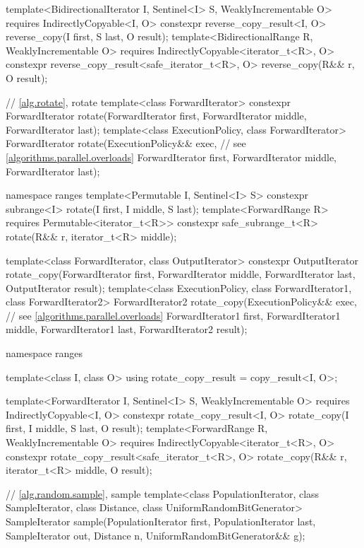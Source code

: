 \begin{codeblock}
{{    template<BidirectionalIterator I, Sentinel<I> S, WeaklyIncrementable O>
      requires IndirectlyCopyable<I, O>
      constexpr reverse_copy_result<I, O>
        reverse_copy(I first, S last, O result);
    template<BidirectionalRange R, WeaklyIncrementable O>
      requires IndirectlyCopyable<iterator_t<R>, O>
      constexpr reverse_copy_result<safe_iterator_t<R>, O>
        reverse_copy(R&& r, O result);
  }

  // \ref{alg.rotate}, rotate
  template<class ForwardIterator>
    constexpr ForwardIterator rotate(ForwardIterator first,
                                     ForwardIterator middle,
                                     ForwardIterator last);
  template<class ExecutionPolicy, class ForwardIterator>
    ForwardIterator rotate(ExecutionPolicy&& exec, // see \ref{algorithms.parallel.overloads}
                           ForwardIterator first,
                           ForwardIterator middle,
                           ForwardIterator last);

  namespace ranges {
    template<Permutable I, Sentinel<I> S>
      constexpr subrange<I> rotate(I first, I middle, S last);
    template<ForwardRange R>
      requires Permutable<iterator_t<R>>
      constexpr safe_subrange_t<R> rotate(R&& r, iterator_t<R> middle);
  }

  template<class ForwardIterator, class OutputIterator>
    constexpr OutputIterator
      rotate_copy(ForwardIterator first, ForwardIterator middle,
                  ForwardIterator last, OutputIterator result);
  template<class ExecutionPolicy, class ForwardIterator1, class ForwardIterator2>
    ForwardIterator2
      rotate_copy(ExecutionPolicy&& exec, // see \ref{algorithms.parallel.overloads}
                  ForwardIterator1 first, ForwardIterator1 middle,
                  ForwardIterator1 last, ForwardIterator2 result);

  namespace ranges {
    template<class I, class O>
    using rotate_copy_result = copy_result<I, O>;

    template<ForwardIterator I, Sentinel<I> S, WeaklyIncrementable O>
      requires IndirectlyCopyable<I, O>
      constexpr rotate_copy_result<I, O>
        rotate_copy(I first, I middle, S last, O result);
    template<ForwardRange R, WeaklyIncrementable O>
      requires IndirectlyCopyable<iterator_t<R>, O>
      constexpr rotate_copy_result<safe_iterator_t<R>, O>
        rotate_copy(R&& r, iterator_t<R> middle, O result);
  }

  // \ref{alg.random.sample}, sample
  template<class PopulationIterator, class SampleIterator,
           class Distance, class UniformRandomBitGenerator>
    SampleIterator sample(PopulationIterator first, PopulationIterator last,
                          SampleIterator out, Distance n,
                          UniformRandomBitGenerator&& g);

}
\end{codeblock}
